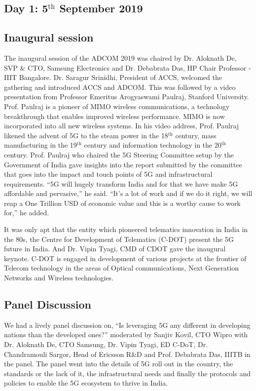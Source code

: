 \begin{multicols}{2}
\section*{Day 1: 5$^{\text{th}}$ September 2019}

\subsection*{Inaugural session}

The inaugural session of the ADCOM 2019 was chaired by Dr. Aloknath De, SVP \& CTO, Samsung Electronics and Dr.  Debabrata Das, HP Chair Professor - IIIT Bangalore. Dr. Saragur Srinidhi, President of ACCS, welcomed the gathering and introduced ACCS and ADCOM. This was followed by a video presentation from Professor Emeritus Arogyaswami Paulraj, Stanford University. Prof. Paulraj is a pioneer of MIMO wireless communications, a technology breakthrough that enables improved wireless performance. MIMO is now incorporated into all new wireless systems. In his video address, Prof. Paulraj likened the advent of 5G to the steam power in the 18$^{\text{th}}$ century, mass manufacturing in the 19$^{\text{th}}$ century and information technology in the 20$^{\text{th}}$ century. Prof. Paulraj who chaired the 5G Steering Committee setup by the Government of India gave insights into the report submitted by the committee that goes into the impact and touch points of 5G and infrastructural requirements. “5G will hugely transform India and for that we have make 5G affordable and pervasive,” he said. “It’s a lot of work and if we do it right, we will reap a One Trillion USD of economic value and this is a worthy cause to work for,” he added.

It was only apt that the entity which pioneered telematics innovation in India in the 80s, the Centre for Development of Telematics (C-DOT) present the 5G future in India. And Dr. Vipin Tyagi, CMD of CDOT gave the inaugural keynote. C-DOT is engaged in development of various projects at the frontier of Telecom technology in the areas of Optical communications, Next Generation Networks and Wireless technologies. 

\subsection*{Panel Discussion}

We had a lively panel discussion on, “Is leveraging 5G any different in developing nations than the developed ones?” moderated by Sanjiv Kovil, CTO Wipro with Dr. Aloknath De, CTO Samsung, Dr. Vipin Tyagi, ED C-DoT, Dr. Chandramouli Sargor, Head of Ericsson R\&D and Prof. Debabrata Das, IIITB in the panel. The panel went into the details of 5G roll out in the country, the standards or the lack of it, the infrastructural needs and finally the protocols and policies to enable the 5G ecosystem to thrive in India.


\end{multicols}
